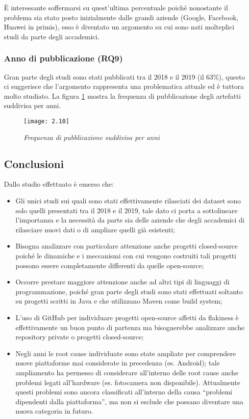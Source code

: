 È interessante soffermarsi su quest’ultima percentuale poiché nonostante il problema sia stato posto inizialmente dalle grandi aziende (Google, Facebook, Huawei in primis), esso è diventato un argomento su cui sono nati molteplici studi da parte degli accademici.
\subsubsection{Anno di pubblicazione (RQ9)}
Gran parte degli studi sono stati pubblicati tra il 2018 e il 2019 (il 63\%), questo ci suggerisce che l’argomento rappresenta una problematica attuale ed è tuttora molto studiato.
La figura \ref{fig:fig.2.10} mostra la frequenza di pubblicazione degli artefatti suddivisa per anni.
\newpage
\begin{figure}[h]
	\centering
	\texttt{[image: 2.10]}
	\caption{\emph{Frequenza di pubblicazione suddivisa per anni}}
	\label{fig:fig.2.10}
\end{figure}
\subsection{Conclusioni}
	Dallo studio effettuato è emerso che:
\begin{itemize}

	\item  Gli unici studi sui quali sono stati effettivamente rilasciati dei dataset sono
	solo quelli presentati tra il 2018 e il 2019, tale dato ci porta a sottolineare l’importanza e la necessità da parte sia delle aziende che degli accademici
	di rilasciare nuovi dati o di ampliare quelli già esistenti;
	\item Bisogna analizzare con particolare attenzione anche progetti closed-source
	poiché le dinamiche e i meccanismi con cui vengono costruiti tali progetti possono essere completamente differenti da quelle open-source;
	\item Occorre prestare maggiore attenzione anche ad altri tipi di linguaggi di programmazione, poiché gran parte degli studi sono stati effettuati soltanto
	su progetti scritti in Java e che utilizzano Maven come build system;
	\item  L’uso di GitHub per individuare progetti open-source affetti da flakiness è effettivamente un buon punto di partenza ma bisognerebbe analizzare anche
	repository private o progetti closed-source;
	\item  Negli anni le root cause individuate sono state ampliate per comprendere nuove piattaforme mai considerate in precedenza (es. Android); tale
	ampliamento ha permesso di considerare all’interno delle root cause anche problemi legati all’hardware (es. fotocamera non disponibile). Attualmente questi problemi sono ancora classificati all’interno della causa “problemi
	dipendenti dalla piattaforma”, ma non si esclude che possano diventare una nuova categoria in futuro.
\end{itemize}
 